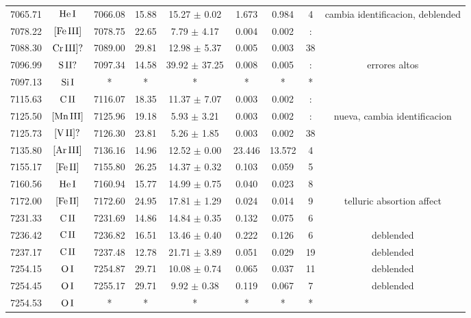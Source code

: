 \documentclass{article}
\begin{document}
\begin{table*}
\begin{adjustbox}{width=\textwidth}
\begin{tabular}{ccccccccc}
7065.71 & $\mbox{He}\thinspace \mbox{I}$ & 7066.08 & 15.88 & 15.27 $\pm$ 0.02 & 1.673 & 0.984 & 4 &  cambia identificacion, deblended \\
7078.22 & $\mbox{[Fe}\thinspace \mbox{III]}$ & 7078.75 & 22.65 & 7.79 $\pm$ 4.17 & 0.004 & 0.002 & : &  \\
7088.30 & $\mbox{Cr}\thinspace \mbox{III]?}$ & 7089.00 & 29.81 & 12.98 $\pm$ 5.37 & 0.005 & 0.003 & 38 &  \\
7096.99 & $\mbox{S}\thinspace \mbox{II?}$ & 7097.34 & 14.58 & 39.92 $\pm$ 37.25 & 0.008 & 0.005 & : &  errores altos \\
7097.13 & $\mbox{Si}\thinspace \mbox{I}$ & * & * & * & * & * & * &  \\
7115.63 & $\mbox{C}\thinspace \mbox{II}$ & 7116.07 & 18.35 & 11.37 $\pm$ 7.07 & 0.003 & 0.002 & : &  \\
7125.50 & $\mbox{[Mn}\thinspace \mbox{III]}$ & 7125.96 & 19.18 & 5.93 $\pm$ 3.21 & 0.003 & 0.002 & : &  nueva, cambia identificacion \\
7125.73 & $\mbox{[V}\thinspace \mbox{II]?}$ & 7126.30 & 23.81 & 5.26 $\pm$ 1.85 & 0.003 & 0.002 & 38 &  \\
7135.80 & $\mbox{[Ar}\thinspace \mbox{III]}$ & 7136.16 & 14.96 & 12.52 $\pm$ 0.00 & 23.446 & 13.572 & 4 &  \\
7155.17 & $\mbox{[Fe}\thinspace \mbox{II]}$ & 7155.80 & 26.25 & 14.37 $\pm$ 0.32 & 0.103 & 0.059 & 5 &  \\
7160.56 & $\mbox{He}\thinspace \mbox{I}$ & 7160.94 & 15.77 & 14.99 $\pm$ 0.75 & 0.040 & 0.023 & 8 &  \\
7172.00 & $\mbox{[Fe}\thinspace \mbox{II]}$ & 7172.60 & 24.95 & 17.81 $\pm$ 1.29 & 0.024 & 0.014 & 9 &  telluric absortion affect \\
7231.33 & $\mbox{C}\thinspace \mbox{II}$ & 7231.69 & 14.86 & 14.84 $\pm$ 0.35 & 0.132 & 0.075 & 6 &  \\
7236.42 & $\mbox{C}\thinspace \mbox{II}$ & 7236.82 & 16.51 & 13.46 $\pm$ 0.40 & 0.222 & 0.126 & 6 &  deblended \\
7237.17 & $\mbox{C}\thinspace \mbox{II}$ & 7237.48 & 12.78 & 21.71 $\pm$ 3.89 & 0.051 & 0.029 & 19 &  deblended \\
7254.15 & $\mbox{O}\thinspace \mbox{I}$ & 7254.87 & 29.71 & 10.08 $\pm$ 0.74 & 0.065 & 0.037 & 11 &  deblended \\
7254.45 & $\mbox{O}\thinspace \mbox{I}$ & 7255.17 & 29.71 & 9.92 $\pm$ 0.38 & 0.119 & 0.067 & 7 &  deblended \\
7254.53 & $\mbox{O}\thinspace \mbox{I}$ & * & * & * & * & * & * &  \\

\end{tabular}
\end{adjustbox}
\end{table*}
\end{document}

